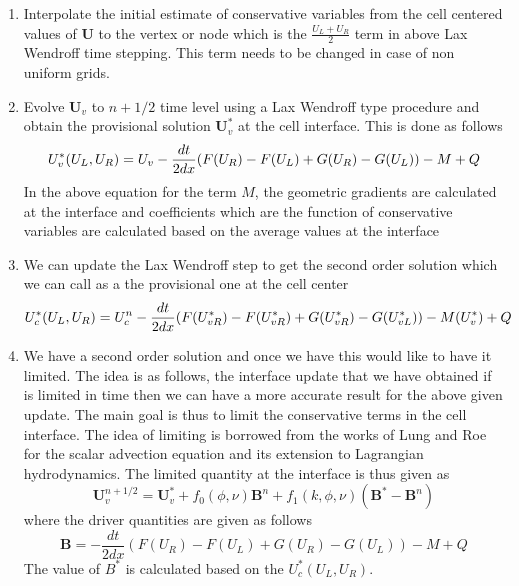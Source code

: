 \documentclass[a4paper,16pt]{article}
\begin{document}
\begin{enumerate}
	\item Interpolate the initial estimate of conservative variables from the cell centered values of $\textbf{U}$ to the vertex or node which is the $\frac{U_L+ U_R}{2}$ term in above Lax Wendroff time stepping. This term needs to be changed in case of non uniform grids.
	\item Evolve $\textbf{U}_v$ to $n+1/2$ time level using a Lax Wendroff type procedure and obtain the provisional solution $\textbf{U}_v^*$ at the cell interface. This is done as follows 
	\begin{equation}
	U_v^*(U_L,U_R) = U_v - \frac{dt}{2 dx}(F(U_R)-F(U_L) + G(U_R)-G(U_L)) - M + Q   \\
	\end{equation}
	In the above equation for the term $M$, the geometric gradients are calculated at the interface and coefficients which are the function of conservative variables are calculated based on the average values at the interface
	\item We can update the Lax Wendroff step to get the second order solution which we can call as a the provisional one at the cell center
	\begin{equation}
	U_c^*(U_L,U_R) = U_c^n - \frac{dt}{2 dx}(F(U_{vR}^*)-F(U_{vR}^*) + G(U_{vR}^*)-G(U_{vL}^*)) - M(U_v^*) + Q \\
	\end{equation}
	\item We have a second order solution and once we have this would like to have it limited. The idea is as follows, the interface update that we have obtained if is limited in time then we can have a more accurate result for the above given update. The main goal is thus to limit the conservative terms in the cell interface. The idea of limiting is borrowed from the works of Lung and Roe for the scalar advection equation and its extension to Lagrangian hydrodynamics. The limited quantity at the interface is thus given as 
	\begin{equation}
	\textbf{U}_v^{n+1/2} = \textbf{U}_v^* + f_0(\phi,\nu) \textbf{B}^n + f_1(k,\phi,\nu)(\textbf{B}^*-\textbf{B}^n)
	\end{equation}
	where the driver quantities are given as follows
	\begin{equation}
	\textbf{B} = - \frac{dt}{2 dx}(F(U_R)-F(U_L) + G(U_R)-G(U_L)) - M + Q
	\end{equation}
	The value of $B^*$ is calculated based on the $U_c^*(U_L,U_R)$.    
	 

\end{enumerate}
\end{document}
